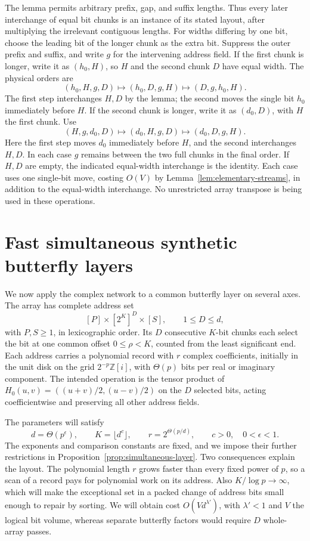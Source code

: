 \documentclass[11pt]{article}
\theoremstyle{definition}
\begin{document}
The lemma permits arbitrary prefix, gap, and suffix lengths.  Thus every
later interchange of equal bit chunks is an instance of its stated
layout, after multiplying the irrelevant contiguous lengths.
For widths differing by one bit, choose the leading bit of the longer
chunk as the extra bit.  Suppress the outer prefix and suffix, and write
$g$ for the intervening address field.  If the first chunk is longer,
write it as $(h_0,H)$, so $H$ and the second chunk $D$ have equal width.
The physical orders are
\[
 (h_0,H,g,D)\longmapsto(h_0,D,g,H)
              \longmapsto(D,g,h_0,H).
\]
The first step interchanges $H,D$ by the lemma; the second moves the
single bit $h_0$ immediately before $H$.  If the second chunk is longer,
write it as $(d_0,D)$, with $H$ the first chunk.  Use
\[
 (H,g,d_0,D)\longmapsto(d_0,H,g,D)
              \longmapsto(d_0,D,g,H).
\]
Here the first step moves $d_0$ immediately before $H$, and the second
interchanges $H,D$.  In each case $g$ remains between the two full chunks
in the final order.  If $H,D$ are empty, the indicated equal-width
interchange is the identity.  Each case uses one single-bit move, costing
$O(V)$ by Lemma~\ref{lem:elementary-streams}, in addition to the
equal-width interchange.  No unrestricted array transpose is being used
in these operations.
 \section{Fast simultaneous synthetic butterfly layers}
\label{sec:fast-butterfly-layers}

We now apply the complex network to a common butterfly layer on several
axes. The array has complete address set
\[
 [P]\times[2^K]^D\times[S],\qquad 1\le D\le d,
\]
with $P,S\ge1$, in lexicographic order. Its $D$ consecutive $K$-bit
chunks each select the bit at one common offset $0\le\rho<K$, counted
from the least significant
end. Each address carries a polynomial record with $r$ complex
coefficients, initially in the unit disk on the grid
$2^{-p}\mathbb Z[i]$, with $\Theta(p)$ bits per real or imaginary
component. The intended operation is the tensor product
of $H_0(u,v)=((u+v)/2,(u-v)/2)$ on the $D$ selected bits, acting
coefficientwise and preserving all other address fields.

The parameters will satisfy
\[
 d=\Theta(p^\epsilon),\qquad K=\lfloor d^c\rfloor,
 \qquad r=2^{\Theta(p/d)},\qquad c>0,\quad 0<\epsilon<1.
\]
The exponents and comparison constants are fixed, and we impose their
further restrictions in Proposition~\ref{prop:simultaneous-layer}.
Two consequences explain the layout. The polynomial length $r$ grows
faster than every fixed power of $p$, so a scan of a record pays for
polynomial work on its address. Also $K/\log p\to\infty$, which will
make the exceptional set in a packed change of address bits small enough
to repair by sorting. We will obtain cost $O(Vd^{\lambda'})$, with
$\lambda'<1$ and $V$ the logical bit volume, whereas separate butterfly
factors would require $D$ whole-array passes.
\end{document}

